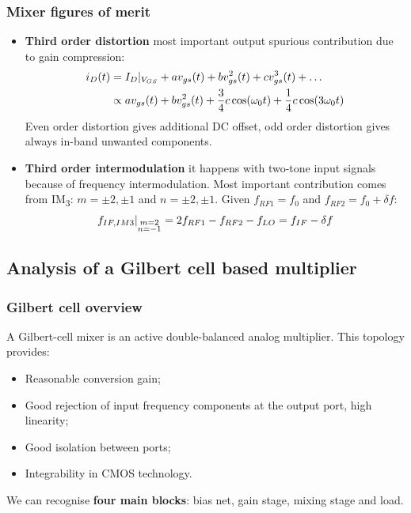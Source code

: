 \begin{frame}
	\frametitle{Mixer figures of merit}
	\begin{itemize}
		\item \textbf{Third order distortion} most important output spurious contribution due to gain compression:
		\begin{align}
			i_D(t) &= I_D|_{V_{GS}}+av_{gs}(t)+bv_{gs}^2(t)+cv_{gs}^3(t)+\dots \notag \\
			& \propto av_{gs}(t)+bv_{gs}^2(t)+\frac{3}{4}c\cos(\omega_0 t) +\frac{1}{4}c\cos(3\omega_0 t) \notag
		\end{align}
		Even order distortion gives additional DC offset, odd order distortion gives always in-band unwanted components.
		\item \textbf{Third order intermodulation} it happens with two-tone input signals because of frequency intermodulation. Most important contribution comes from IM\textsubscript{3}: $m=\pm2,\pm1$ and $n=\pm2,\pm1$. Given $f_{RF1} = f_0$ and $f_{RF2}=f_0+\delta f$:
		\begin{equation}
			f_{IF,IM3}|_{\substack{m=2\\n=-1}} = 2f_{RF1} - f_{RF2} -f_{LO}= f_{IF} - \delta f \notag
		\end{equation} 
	\end{itemize}
\end{frame}

\subsection{Analysis of a Gilbert cell based multiplier}

\begin{frame} %
\tableofcontents[currentsubsection]
\end{frame}

\begin{frame}
	\frametitle{Gilbert cell overview}
	A Gilbert-cell mixer is an active double-balanced analog multiplier. This topology provides:
	\begin{itemize}
		\item Reasonable conversion gain;
		\item Good rejection of input frequency components at the output port, high linearity;
		\item Good isolation between ports;
		\item Integrability in CMOS technology.
	\end{itemize}
	We can recognise \textbf{four main blocks}: bias net, gain stage, mixing stage and load. 
\end{frame}

